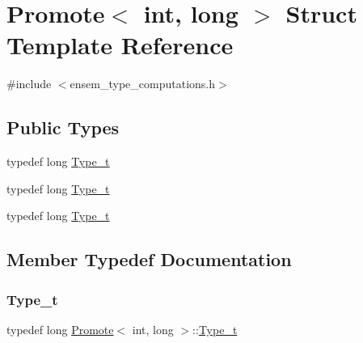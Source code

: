 \hypertarget{structPromote_3_01int_00_01long_01_4}{}\section{Promote$<$ int, long $>$ Struct Template Reference}
\label{structPromote_3_01int_00_01long_01_4}


{\ttfamily \#include $<$ensem\+\_\+type\+\_\+computations.\+h$>$}

\subsection*{Public Types}
\begin{DoxyCompactItemize}
\item 
typedef long \mbox{\hyperlink{structPromote_3_01int_00_01long_01_4_a91635f57c2365f0636c638aa4f311374}{Type\+\_\+t}}
\item 
typedef long \mbox{\hyperlink{structPromote_3_01int_00_01long_01_4_a91635f57c2365f0636c638aa4f311374}{Type\+\_\+t}}
\item 
typedef long \mbox{\hyperlink{structPromote_3_01int_00_01long_01_4_a91635f57c2365f0636c638aa4f311374}{Type\+\_\+t}}
\end{DoxyCompactItemize}


\subsection{Member Typedef Documentation}
\mbox{\label{structPromote_3_01int_00_01long_01_4_a91635f57c2365f0636c638aa4f311374}} 
\subsubsection{\texorpdfstring{Type\_t}{Type\_t}\hspace{0.1cm}{\footnotesize\ttfamily [1/3]}}
{\footnotesize\ttfamily typedef long \mbox{\hyperlink{structPromote}{Promote}}$<$ int, long $>$\+::\mbox{\hyperlink{structPromote_3_01int_00_01long_01_4_a91635f57c2365f0636c638aa4f311374}{Type\+\_\+t}}}

\mbox{\label{structPromote_3_01int_00_01long_01_4_a91635f57c2365f0636c638aa4f311374}} 
